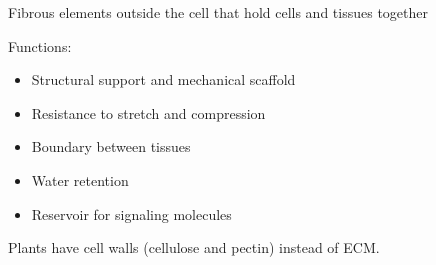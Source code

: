 Fibrous elements outside the cell that hold cells and tissues together

Functions:
\begin{itemize}
    \item Structural support and mechanical scaffold
    \item Resistance to stretch and compression
    \item Boundary between tissues
    \item Water retention
    \item Reservoir for signaling molecules
\end{itemize}
Plants have cell walls (cellulose and pectin) instead of ECM.

